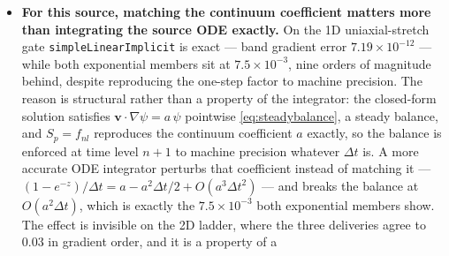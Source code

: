 \documentclass[preprint,3p,11pt]{elsarticle}
\newcommand{\psilev}{\psi}
\begin{document}
\begin{itemize}
    ends up: shape $+1.883 \rightarrow +1.256$ and volume $+2.090 \rightarrow
    +1.718$ on the four-rank seven-rung ladder (Table~\ref{tab:expsource}), and
    $+1.600 \rightarrow +1.360$ and $+1.638 \rightarrow +1.439$ on the serial
    three-rung one (Table~\ref{tab:expimplicit}). That attribution was an argument
    from the structure of \eqref{eq:expsource} until a member existed that carries
    the same factor \emph{with} diagonal support. \texttt{exponentialImplicit}
    \eqref{eq:expimplicit}, $S_p = (1-e^{-z})/\Delta t$ with $S_c = 0$, is that
    member, and it repairs the loss completely: $+0.912$, $+1.603$ and $+1.653$
    against \texttt{simpleLinearImplicit}'s $+0.908$, $+1.600$ and $+1.638$ on one
    serial ladder, and a factor of $770$ better than the explicit form in both
    interface position and phase volume on the 1D gate
    (Table~\ref{tab:expimplicit1d}). The coefficient is $(1-e^{-z})/\Delta t$ and
    not $(e^{z}-1)/\Delta t$: the latter is the \emph{explicit} coefficient, and
    used implicitly it gives $\psilev^{n+1} = \psilev^n/(2-e^{z})$, with a pole at
    $z = \ln 2$ and a sign-flipped $\psilev$ beyond it. The explicit member is
    superseded; the implicit one holds the unconditional sign preservation that
    was the explicit member's sole retained justification, through
    $1 - S_p\Delta t = e^{-z} > 0$, and pays nothing for it.
  \item \textbf{For this source, matching the continuum coefficient matters more
    than integrating the source ODE exactly.} On the 1D uniaxial-stretch gate
    \texttt{simpleLinearImplicit} is exact --- band gradient error
    $7.19\times10^{-12}$ --- while both exponential members sit at
    $7.5\times10^{-3}$, nine orders of magnitude behind, despite reproducing the
    one-step factor to machine precision. The reason is structural rather than a
    property of the integrator: the closed-form solution satisfies
    $\mathbf{v}\cdot\nabla\psilev = a\,\psilev$ pointwise
    \eqref{eq:steadybalance}, a steady balance, and $S_p = f_{nl}$ reproduces the
    continuum coefficient $a$ exactly, so the balance is enforced at time level
    $n+1$ to machine precision whatever $\Delta t$ is. A more accurate ODE
    integrator perturbs that coefficient instead of matching it ---
    $(1-e^{-z})/\Delta t = a - a^2\Delta t/2 + O(a^3 \Delta t^2)$ --- and breaks
    the balance at $O(a^2\Delta t)$, which is exactly the $7.5\times10^{-3}$ both
    exponential members show. The effect is invisible on the 2D ladder, where the
    three deliveries agree to $0.03$ in gradient order, and it is a property of a

\end{itemize}
\end{document}
